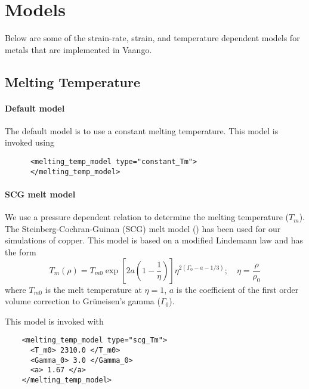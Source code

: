 \section{Models}
  Below are some of the strain-rate, strain, and temperature dependent models 
  for metals that are implemented in Vaango.


\subsection{Melting Temperature}
  \paragraph{Default model}
  The default model is to use a constant melting temperature.  This model
  is invoked using
  \lstset{language=XML}
  \begin{lstlisting}  
      <melting_temp_model type="constant_Tm">
      </melting_temp_model>
  \end{lstlisting}  
  
  \paragraph{SCG melt model}
  We use a pressure dependent relation to determine the melting 
  temperature ($T_m$).  The Steinberg-Cochran-Guinan (SCG) melt model 
  (\cite{Steinberg1980}) has been used for our simulations of copper.  
  This model is based on a modified Lindemann law and has the form
  \begin{equation} \label{eq:TmSCG}
    T_m(\rho) = T_{m0} \exp\left[2a\left(1-\frac{1}{\eta}\right)\right]
              \eta^{2(\Gamma_0-a-1/3)}; \quad
    \eta = \frac{\rho}{\rho_0}
  \end{equation}
  where $T_{m0}$ is the melt temperature at $\eta = 1$, 
  $a$ is the coefficient of the first order volume correction to 
  Gr{\"u}neisen's gamma ($\Gamma_0$).  

  This model is invoked with
  \lstset{language=XML}
  \begin{lstlisting}
    <melting_temp_model type="scg_Tm">
      <T_m0> 2310.0 </T_m0>
      <Gamma_0> 3.0 </Gamma_0>
      <a> 1.67 </a>
    </melting_temp_model>
  \end{lstlisting}

